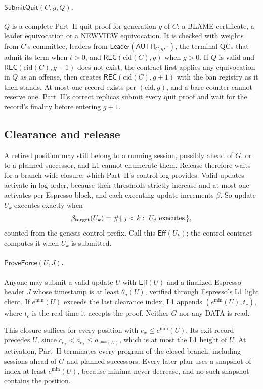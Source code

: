 \documentclass[11pt,a4paper]{article}
\newcommand{\tagg}[1]{\mathsf{#1}}
\newcommand{\emin}{e^{\min}}
\newcommand{\cid}{\mathrm{cid}}
\begin{document}
\paragraph{$\tagg{SubmitQuit}(C,g,Q)$.} $Q$ is a complete Part~II quit
proof for generation $g$ of $C$: a BLAME certificate, a leader
equivocation or a NEWVIEW equivocation. It is checked with weights from
$C$'s committee, leaders from $\tagg{Leader}(\tagg{AUTH}_{C,g},\cdot)$, the
terminal QCs that admit its term when $t>0$, and $\tagg{REC}(\cid(C),g)$
when $g>0$. If $Q$ is valid and $\tagg{REC}(\cid(C),g+1)$ does not exist,
the contract first applies any equivocation in $Q$ as an offense, then
creates $\tagg{REC}(\cid(C),g+1)$ with the ban registry as it then stands.
At most one record exists per $(\cid,g)$, and a bare counter cannot
reserve one. Part~II's correct replicas submit every quit proof and wait
for the record's finality before entering $g+1$.

\subsection{Clearance and release}
\label{sec:release}
A retired position may still belong to a running session, possibly ahead
of $G$, or to a planned successor, and L1 cannot enumerate them. Release
therefore waits for a branch-wide closure, which Part~II's control log
provides. Valid updates activate in log order, because their thresholds
strictly increase and at most one activates per Espresso block, and each
executing update increments $\beta$. So update $U_k$ executes exactly when
\begin{equation}\label{eq:eff}
 \beta_{\rm target}(U_k)=\#\{\,j<k:\ U_j\text{ executes}\,\},
\end{equation}
counted from the genesis control prefix. Call this $\tagg{Eff}(U_k)$; the
control contract computes it when $U_k$ is submitted.

\paragraph{$\tagg{ProveForce}(U,J)$.} Anyone may submit a valid update $U$
with $\tagg{Eff}(U)$ and a finalized Espresso header $J$ whose timestamp
is at least $\theta_a(U)$, verified through Espresso's L1 light client.
If $\emin(U)$ exceeds the last clearance index, L1 appends
$(\emin(U),t_c)$, where $t_c$ is the real time it accepts the proof.
Neither $G$ nor any DATA is read.

This closure suffices for every position with $e_x\le\emin(U)$. Its exit
record precedes $U$, since
$c_{e_x}<a_{e_x}\le a_{\emin(U)}$, which is at most the L1 height of $U$.
At activation, Part~II terminates every program of the closed branch,
including sessions ahead of $G$ and planned successors. Every later plan
uses a snapshot of index at least $\emin(U)$, because minima never
decrease, and no such snapshot contains the position.
\end{document}
